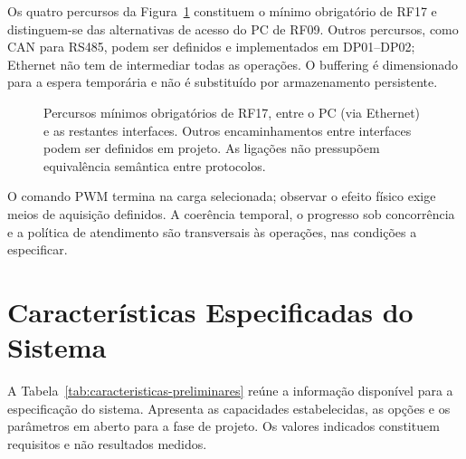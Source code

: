 Os quatro percursos da Figura~\ref{fig:percursos-obrigatorios} constituem o mínimo
obrigatório de RF17 e distinguem-se das alternativas de acesso do PC de
RF09. Outros percursos, como CAN para RS485, podem ser definidos e
implementados em DP01--DP02; Ethernet não tem de intermediar todas as
operações. O buffering é
dimensionado para a espera temporária e não é substituído por
armazenamento persistente.

\begin{figure}[htbp]
    \centering
    \caption[Percursos mínimos obrigatórios entre interfaces.]{Percursos mínimos obrigatórios de RF17, entre o PC (via Ethernet) e as restantes interfaces. Outros encaminhamentos entre interfaces podem ser definidos em projeto. As ligações não pressupõem equivalência semântica entre protocolos.}
    \label{fig:percursos-obrigatorios}
\end{figure}

O comando PWM termina na carga selecionada; observar o efeito físico
exige meios de aquisição definidos. A coerência temporal, o progresso
sob concorrência e a política de atendimento são transversais às
operações, nas condições a especificar.

\section{Características Especificadas do Sistema}

A Tabela~\ref{tab:caracteristicas-preliminares} reúne a informação
disponível para a especificação do sistema. Apresenta as capacidades
estabelecidas, as opções e os parâmetros em aberto para a fase de projeto.
Os valores indicados constituem requisitos e não resultados medidos.

